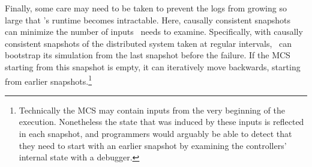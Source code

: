 Finally, some care may need to be taken to prevent the logs from growing so large that
\simulator's runtime becomes intractable. Here, causally consistent
snapshots~\cite{Chandy:1985:DSD:214451.214456} can minimize the number of inputs \simulator~needs
to examine. Specifically, with causally consistent snapshots of the distributed
system taken at regular intervals, \simulator~can bootstrap its simulation from the last snapshot before the failure.
If the MCS starting from this snapshot is empty, it can iteratively move backwards, starting from earlier
snapshots.\footnote{Technically the MCS may contain inputs from the very
beginning of the execution. Nonetheless the state that was induced by these inputs is
reflected in each snapshot, and
programmers would arguably be able to detect that they need to start with an
earlier snapshot by examining the controllers' internal state with a debugger.}


